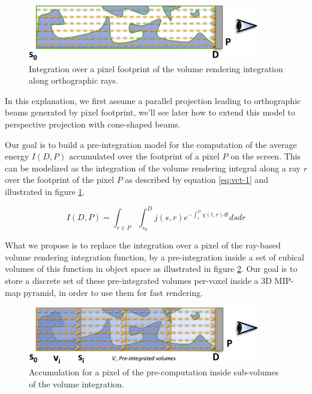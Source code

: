 \begin{figure}\label{f:vct-pre-integration-1}
	\begin{center}
		\includegraphics[width=0.9\textwidth]{graphics/vct/vct-7-1}
	\end{center}
	\caption{Integration over a pixel footprint of the volume rendering integration along orthographic rays.}
\end{figure}

In this explanation, we first assume a parallel projection leading to orthographic beams generated by pixel footprint, we'll see later how to extend this model to perspective projection with cone-shaped beams.



Our goal is to build a pre-integration model for the computation of the average energy $I(D,P)$ accumulated over the footprint of a pixel $P$ on the screen. This can be modelized as the integration of the volume rendering integral along a ray $r$ over the footprint of the pixel $P$ as described by equation \ref{eq:vct-1} and illustrated in figure \ref{f:vct-pre-integration-1}. 

\begin{equation}\label{eq:vct-1}
	I(D,P)=\int_{r\in P}\int^{D}_{s_0}j(s,r)e^{-\int^{D}_s\chi(t,r)dt}dsdr
\end{equation}

What we propose is to replace the integration over a pixel of the ray-based volume rendering integration function, by a pre-integration inside a set of cubical volumes of this function in object space as illustrated in figure \ref{f:vct-pre-integration-2}. Our goal is to store a discrete set of these pre-integrated volumes per-voxel inside a 3D MIP-map pyramid, in order to use them for fast rendering.

\begin{figure}\label{f:vct-pre-integration-2}
	\begin{center}
		\includegraphics[width=0.9\textwidth]{graphics/vct/vct-7-2}
	\end{center}
	\caption{Accumulation for a pixel of the pre-computation inside sub-volumes of the volume integration.}
\end{figure}

